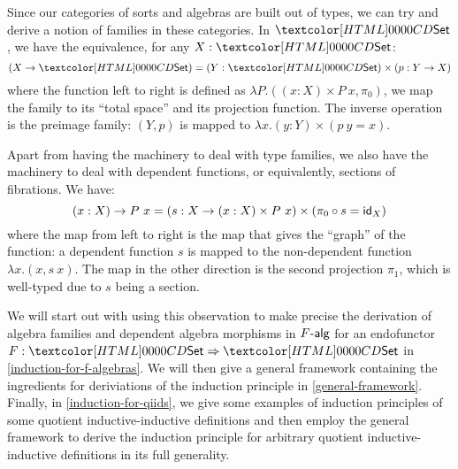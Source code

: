 Since our categories of sorts and algebras are built out of types, we
can try and derive a notion of families in these categories. In
$\Set$, we have the equivalence, for any $X : \Set$:
$$
(X \to \Set) = (Y : \Set) \times (p : Y \to X)
$$
where the function left to right is defined as
$\lambda P . ((x : X) \times P\ x , \pi_0)$, \ie we map the family to
its ``total space'' and its projection function. The inverse operation
is the preimage family: $(Y,p)$ is mapped to
$\lambda x . (y : Y) \times (p\ y = x)$. 

Apart from having the machinery to deal with type families, we also
have the machinery to deal with dependent functions, or equivalently,
sections of fibrations. We have:
$$
(x : X) \to P\ x = (s : X \to (x : X) \times P\ x) \times (\pi_0 \circ s = \id_{X})
$$
where the map from left to right is the map that gives the ``graph''
of the function: a dependent function $s$ is mapped to the
non-dependent function $\lambda x . (x , s\ x)$. The map in the other
direction is the second projection $\pi_1$, which is well-typed due to
$s$ being a section.

We will start out with using this observation to make precise the
derivation of algebra families and dependent algebra morphisms in
$\algcat{F}$ for an endofunctor $F : \Func{\Set}{\Set}$ in
\cref{induction-for-f-algebras}. We will then give a general framework
containing the ingredients for deriviations of the induction principle
in \cref{general-framework}. Finally, in \cref{induction-for-qiids},
we give some examples of induction principles of some quotient
inductive-inductive definitions and then employ the general framework
to derive the induction principle for arbitrary quotient
inductive-inductive definitions in its full generality.


